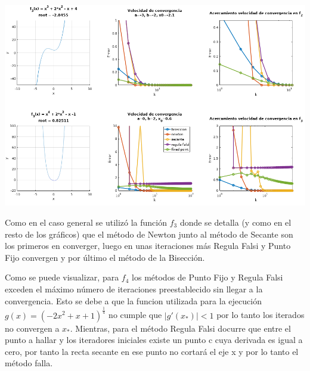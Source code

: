 \documentclass[11pt]{article}
\begin{document}
\includegraphics[keepaspectratio, width=15cm]{Error2.png}
\caption{\\}
Como en el caso general se utilizó la función $f_3$ donde se detalla (y como en el resto de los gráficos) que el método de Newton junto al método de Secante son los primeros en converger, luego en unas iteraciones más Regula Falsi y Punto Fijo convergen y por último el método de la Bisección. 

Como se puede visualizar, para $f_4$ los métodos de Punto Fijo y Regula Falsi exceden el máximo número de iteraciones preestablecido sin llegar a la convergencia. Esto se debe a que la funcion utilizada para la ejecución $g(x) =(-2x^2 + x + 1 )^\frac{1}{4} $ no cumple que $|g'(x_*)| < 1$ por lo tanto los iterados no convergen a $x_*$. Mientras, para el método Regula Falsi docurre que entre el punto a hallar y los iteradores iniciales existe un punto c cuya derivada es igual a cero, por tanto la recta secante en ese punto no cortará el eje x y por lo tanto el método falla.


\vspace{1cm}
\end{document}
